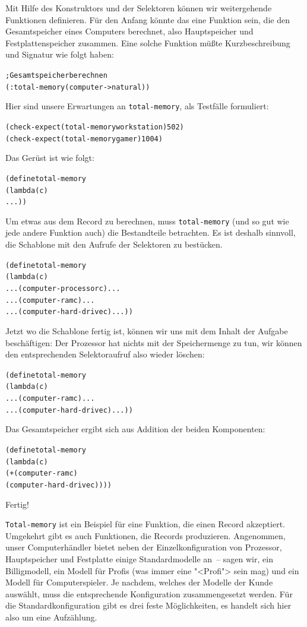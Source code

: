 Mit Hilfe des Konstruktors und der Selektoren können wir weitergehende
Funktionen definieren.
Für den Anfang könnte das
eine Funktion sein, die den Gesamtspeicher eines Computers berechnet,
also Hauptspeicher und Festplattenspeicher zusammen.
Eine solche Funktion müßte Kurzbeschreibung und Signatur wie folgt
haben: 
%
\begin{alltt}
; Gesamtspeicher berechnen
(: total-memory (computer -> natural))
\end{alltt}
%
Hier sind unsere Erwartungen an \texttt{total-memory}, als Testfälle
formuliert:
%
\begin{alltt}
(check-expect (total-memory workstation) 502)
(check-expect (total-memory gamer) 1004)
\end{alltt}
% 
Das Gerüst ist wie folgt:
%
\begin{alltt}
(define total-memory
  (lambda (c)
    ...))
\end{alltt}
%
Um etwas aus dem Record zu berechnen, muss \texttt{total-memory} (und
so gut wie jede andere Funktion auch) die Bestandteile betrachten.  Es
ist deshalb sinnvoll, die Schablone mit den Aufrufe der Selektoren zu
bestücken.
%
\begin{alltt}
(define total-memory
  (lambda (c)
    ... (computer-processor c) ...
    ... (computer-ram c) ...
    ... (computer-hard-drive c) ...))
\end{alltt}
%
Jetzt wo die Schablone fertig ist, können wir uns mit dem Inhalt der
Aufgabe beschäftigen: Der Prozessor hat nichts mit der
Speichermenge zu tun, wir können den entsprechenden Selektoraufruf
also wieder löschen:
%
\begin{alltt}
(define total-memory
  (lambda (c)
    ... (computer-ram c) ...
    ... (computer-hard-drive c) ...))
\end{alltt}
%
Das Gesamtspeicher ergibt sich aus Addition der beiden Komponenten:
%
\begin{alltt}
(define total-memory
  (lambda (c)
    (+ (computer-ram c)
       (computer-hard-drive c))))
\end{alltt}
%
Fertig!

\texttt{Total-memory} ist ein Beispiel für eine Funktion, die einen
Record akzeptiert.  Umgekehrt gibt es auch Funktionen, die Records
produzieren.  Angenommen, unser Computerhändler bietet neben der
Einzelkonfiguration von Prozessor, Hauptspeicher und Festplatte einige
Standardmodelle an~-- sagen wir, ein Billigmodell, ein Modell für
Profis (was immer eine "<Profi"> sein mag) und ein Modell für
Computerspieler.  Je nachdem, welches der Modelle der Kunde auswählt,
muss die entsprechende Konfiguration zusammengesetzt werden.  Für die
Standardkonfiguration gibt es drei feste Möglichkeiten, es handelt
sich hier also um eine Aufzählung.

